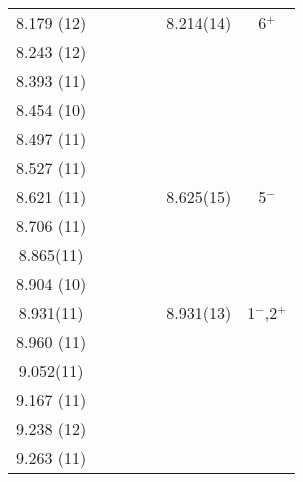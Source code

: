 \begin{center}
\begin{longtable}{cc c cc cc}
  8.179 (12)    &       &                   &                   &                   &    8.214(14)      &   6$^+$           \\
  8.243 (12)    &       &                   &                   &                   &                   &                   \\
  8.393 (11)    &       &                   &                   &                   &                   &                   \\
  8.454 (10)    &       &                   &                   &                   &                   &                   \\
  8.497 (11)    &       &                   &                   &                   &                   &                   \\
  8.527 (11)    &       &                   &                   &                   &                   &                   \\
  8.621 (11)    &       &                   &                   &                   &    8.625(15)      &   5$^-$           \\
  8.706 (11)    &       &                   &                   &                   &                   &                   \\
   8.865(11)    &       &                   &                   &                   &                   &                   \\
  8.904 (10)    &       &                   &                   &                   &                   &                   \\
 8.931(11)      &       &                   &                   &                   &    8.931(13)      &   1$^-$,2$^+$     \\
  8.960 (11)    &       &                   &                   &                   &                   &                   \\
   9.052(11)    &       &                   &                   &                   &                   &                   \\
  9.167 (11)    &       &                   &                   &                   &                   &                   \\
  9.238 (12)    &       &                   &                   &                   &                   &                   \\
  9.263 (11)    &       &                   &                   &                   &                   &                   \\

\end{longtable}
\end{center}
